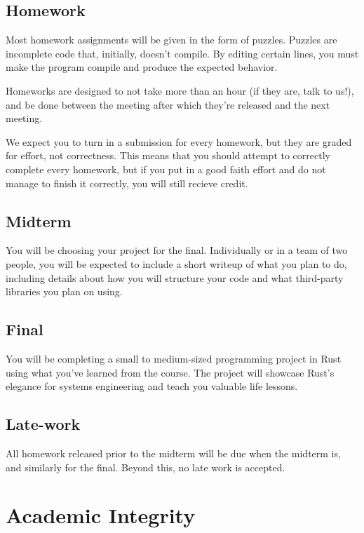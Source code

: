 \documentclass{article}
\begin{document}
\subsection*{Homework}
 
Most homework assignments will be given in the form of puzzles. Puzzles are
incomplete code that, initially, doesn't compile. By editing certain lines, you
must make the program compile and produce the expected behavior.

Homeworks are designed to not take more than an hour (if they are, talk to us!),
and be done between the meeting after which they're released and the next
meeting.

We expect you to turn in a submission for every homework, but they are graded
for effort, not correctness. This means that you should attempt to correctly
complete every homework, but if you put in a good faith effort and do not manage
to finish it correctly, you will still recieve credit.

\subsection*{Midterm}

You will be choosing your project for the final. Individually or in a team of
two people, you will be expected to include a short writeup of what you plan to
do, including details about how you will structure your code and what
third-party libraries you plan on using.

\subsection*{Final}

You will be completing a small to medium-sized programming project in Rust using
what you've learned from the course. The project will showcase Rust's elegance
for systems engineering and teach you valuable life lessons.

\subsection*{Late-work}

All homework released prior to the midterm will be due when the midterm is, and
similarly for the final. Beyond this, no late work is accepted.

\section*{Academic Integrity}
\end{document}
